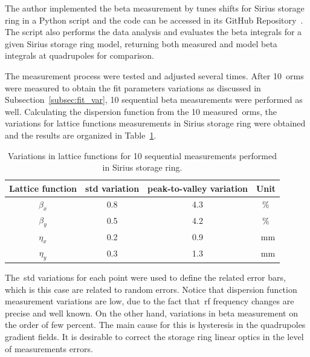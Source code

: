 The author implemented the beta measurement by tunes shifts for Sirius storage ring in a Python script and the code can be accessed in its GitHub Repository~\cite{betasirius}. The script also performs the data analysis and evaluates the beta integrals for a given Sirius storage ring model, returning both measured and model beta integrals at quadrupoles for comparison.

The measurement process were tested and adjusted several times. After 10~\gls{orm}s were measured to obtain the fit parameters variations as discussed in Subsection~\ref{subsec:fit_var}, 10 sequential beta measurements were performed as well. Calculating the dispersion function from the 10 measured~\gls{orm}s, the variations for lattice functions measurements in Sirius storage ring were obtained and the results are organized in Table~\ref{tab:twiss_var_meas}. 
\begin{table}[h!]
    \centering
    \caption{Variations in lattice functions for 10 sequential measurements performed in Sirius storage ring.}
    \label{tab:twiss_var_meas}
    \begin{tabular}{cccc}
        \toprule\toprule
        Lattice function & std variation & peak-to-valley variation & Unit \\
        \hline
        $\beta_x$ & \num{0.8}& \num{4.3} & \%\\
        $\beta_y$ & \num{0.5} & \num{4.2}& \% \\
        $\eta_x$ & \num{0.2} & \num{0.9} & \SI{}{\milli\meter}\\
        $\eta_y$ & \num{0.3} & \num{1.3} & \SI{}{\milli\meter} \\
        \bottomrule\bottomrule
    \end{tabular}
\end{table}

The~\gls{std} variations for each point were used to define the related error bars, which is this case are related to random errors. Notice that dispersion function measurement variations are low, due to the fact that~\gls{rf} frequency changes are precise and well known. On the other hand, variations in beta measurement on the order of few percent. The main cause for this is hysteresis in the quadrupoles gradient fields. It is desirable to correct the storage ring linear optics in the level of measurements errors.

